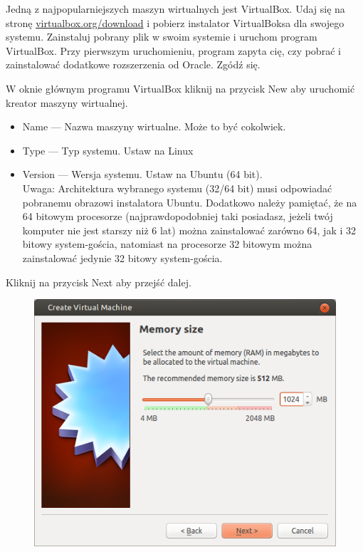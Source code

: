 Jedną z najpopularniejszych maszyn wirtualnych jest VirtualBox. Udaj się na stronę \href{https://www.virtualbox.org/wiki/Downloads}{virtualbox.org/download} i pobierz instalator VirtualBoksa dla swojego systemu. Zainstaluj pobrany plik w swoim systemie i uruchom program VirtualBox. Przy pierwszym uruchomieniu, program zapyta cię, czy pobrać i zainstalować dodatkowe rozszerzenia od Oracle. Zgódź się.

W oknie głównym programu VirtualBox kliknij na przycisk \textcolor{ubuntu_orange}{New} aby uruchomić kreator maszyny wirtualnej.


\begin{itemize}
\item \textcolor{ubuntu_orange}{Name} --- Nazwa maszyny wirtualne. Może to być cokolwiek.
\item \textcolor{ubuntu_orange}{Type} --- Typ systemu. Ustaw na \textcolor{ubuntu_orange}{Linux}
\item \textcolor{ubuntu_orange}{Version} --- Wersja systemu. Ustaw na \textcolor{ubuntu_orange}{Ubuntu (64 bit)}.\\
Uwaga: Architektura wybranego systemu (32/64 bit) musi odpowiadać pobranemu obrazowi instalatora Ubuntu. Dodatkowo należy pamiętać, że na 64 bitowym procesorze (najprawdopodobniej taki posiadasz, jeżeli twój komputer nie jest starszy niż 6 lat) można zainstalować zarówno 64, jak i 32 bitowy system-gościa, natomiast na procesorze 32 bitowym można zainstalować jedynie 32 bitowy system-gościa.
\end{itemize}
\begin{flushright}
Kliknij na przycisk \textcolor{ubuntu_orange}{Next} aby przejść dalej.
\end{flushright}

\clearpage
\begin{figure}
	\vspace{-10pt}
	\includegraphics[width=\linewidth]{images/virtualbox_wizard2.png}
\end{figure}

